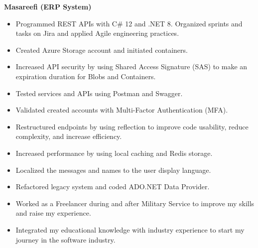 


{\bfseries Masareefi (ERP System)}
\begin{itemize}
    \item Programmed REST APIs with C\# 12 and .NET 8. Organized sprints and tasks on Jira and applied Agile engineering practices.
    \item Created Azure Storage account and initiated containers.
    \item Increased API security by using Shared Access Signature (SAS) to make an expiration duration for Blobs and Containers.
    \item Tested services and APIs using Postman and Swagger.
    \item Validated created accounts with Multi-Factor Authentication (MFA).
    \item Restructured endpoints by using reflection to improve code usability, reduce complexity, and increase efficiency.
    \item Increased performance by using local caching and Redis storage.
    \item Localized the messages and names to the user display language.
    \item Refactored legacy system and coded ADO.NET Data Provider.
\end{itemize}

\divider

\begin{itemize}
    \item Worked as a Freelancer during and after Military Service to improve my skills and raise my experience.
    \item Integrated my educational knowledge with industry experience to start my journey in the software industry.
\end{itemize}

